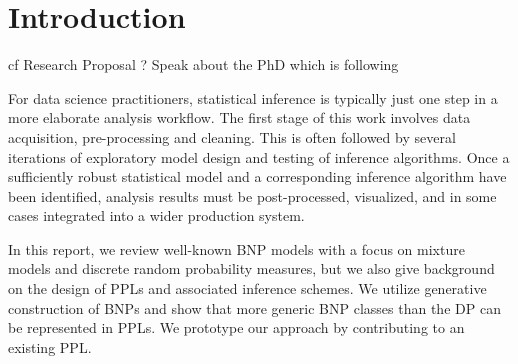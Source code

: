 \documentclass[twoside,10pt,openany,a4paper]{rapport}
\begin{document}

\mainmatter


\chapter{Introduction}
cf Research Proposal ?
Speak about the PhD which is following

For data science practitioners, statistical inference is typically just one step in a more elaborate analysis workflow. The first stage of this work involves data acquisition, pre-processing and cleaning. This is often followed by several iterations of exploratory model design and testing of inference algorithms. Once a sufficiently robust statistical model and a corresponding inference algorithm have been identified, analysis results must be post-processed, visualized, and in some cases integrated into a wider production system.







In this report, we review well-known \gls{BNP} models with a focus on mixture models and discrete random probability measures, but we also give background on the design of \glspl{PPL} and associated inference schemes. We utilize generative construction of \glspl{BNP} and show that more generic \gls{BNP} classes than the \acrlong{DP} can be represented in \glspl{PPL}. We prototype our approach by contributing to an existing \gls{PPL}.
\end{document}
